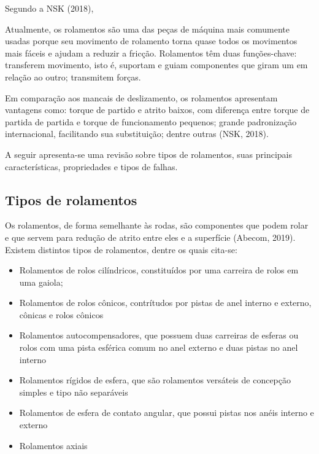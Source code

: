 \documentclass[
	12pt,				
	oneside,			
	a4paper,			
	english,			
	brazil				
	]{abntex2ppgsi}
\begin{document}
Segundo a NSK (2018), 

\begin{citacao}
Atualmente, os rolamentos são uma das peças de máquina mais comumente usadas porque seu movimento de rolamento torna quase todos os movimentos mais fáceis e ajudam a reduzir a fricção. Rolamentos têm duas funções-chave: transferem movimento, isto é, suportam e guiam componentes que giram um em relação ao outro; transmitem forças.
\end{citacao}

Em comparação aos mancais de deslizamento, os rolamentos apresentam vantagens como: torque de partido e atrito baixos, com diferença entre torque de partida de partida e torque de funcionamento pequenos; grande padronização internacional, facilitando sua substituição; dentre outras (NSK, 2018).

A seguir apresenta-se uma revisão sobre tipos de rolamentos, suas principais características, propriedades e tipos de falhas.


\subsection{\textbf{Tipos de rolamentos}}

Os rolamentos, de forma semelhante às rodas, são componentes que podem rolar  e que servem para redução de atrito entre eles e a superfície (Abecom, 2019). Existem distintos tipos de rolamentos, dentre os quais cita-se:

\begin{itemize}
	\item Rolamentos de rolos cilíndricos, constituídos por uma carreira de rolos em uma gaiola; 
	\item Rolamentos de rolos cônicos, contrítudos por pistas de anel interno e externo, cônicas e rolos cônicos
	\item Rolamentos autocompensadores, que possuem duas carreiras de esferas ou rolos com uma pista esférica comum no anel externo e duas pistas no anel interno 
	\item Rolamentos rígidos de esfera, que são rolamentos versáteis de concepção simples e tipo não separáveis
	\item Rolamentos de esfera de contato angular, que possui pistas nos anéis interno e externo
	\item Rolamentos axiais
\end{itemize}
\end{document}

